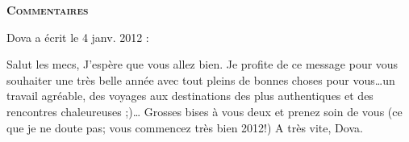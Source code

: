 \bigskip
\textbf{\textsc{Commentaires}}

\medskip
Dova a écrit le 4 janv. 2012 :
\begin{displayquote}
Salut les mecs,
J'espère que vous allez bien.
Je profite de ce message pour vous souhaiter une très belle année avec tout pleins de bonnes choses pour vous\dots un travail agréable, des voyages aux destinations des plus authentiques et des rencontres chaleureuses ;)\dots
Grosses bises à vous deux et prenez soin de vous (ce que je ne doute pas; vous commencez très bien 2012!)
A très vite,
Dova.
\end{displayquote}

\vfill
